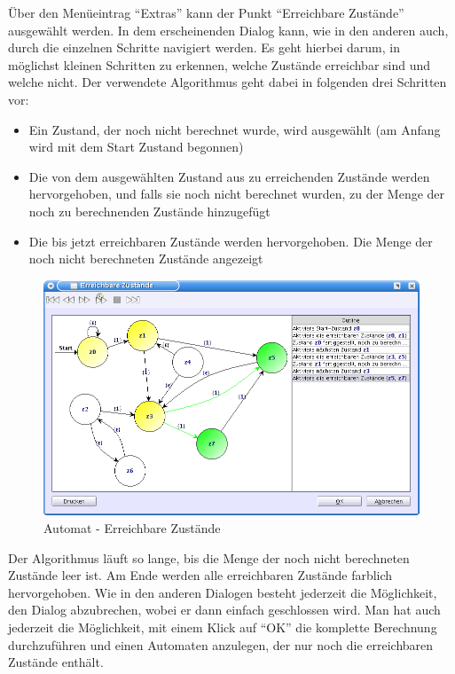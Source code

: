 Über den Menüeintrag "`Extras"' kann der Punkt "`Erreichbare Zustände"'
ausgewählt werden. In dem erscheinenden Dialog kann, wie in den anderen auch,
durch die einzelnen Schritte navigiert werden. Es geht hierbei darum, in
möglichst kleinen Schritten zu erkennen, welche Zustände erreichbar sind und
welche nicht. Der verwendete Algorithmus geht dabei in folgenden drei Schritten
vor:

\begin{itemize}
  \item Ein Zustand, der noch nicht berechnet wurde, wird ausgewählt (am Anfang
  wird mit dem Start Zustand begonnen)
  \item Die von dem ausgewählten Zustand aus zu erreichenden Zustände werden
  hervorgehoben, und falls sie noch nicht berechnet wurden, zu der Menge der
  noch zu berechnenden Zustände hinzugefügt
  \item Die bis jetzt erreichbaren Zustände werden hervorgehoben. Die Menge der
  noch nicht berechneten Zustände angezeigt 
\end{itemize}

\begin{figure}[h!]
\begin{center}
\includegraphics[width=12cm]{../images/reachable_states.png}
\caption{Automat - Erreichbare Zustände}
\end{center}
\end{figure}

Der Algorithmus läuft so lange, bis die Menge der noch nicht berechneten Zustände
leer ist. Am Ende werden alle erreichbaren Zustände farblich hervorgehoben. Wie
in den anderen Dialogen besteht jederzeit die Möglichkeit, den Dialog
abzubrechen, wobei er dann einfach geschlossen wird. Man hat auch jederzeit die
Möglichkeit, mit einem Klick auf "`OK"' die komplette Berechnung durchzuführen
und einen Automaten anzulegen, der nur noch die erreichbaren Zustände enthält.
